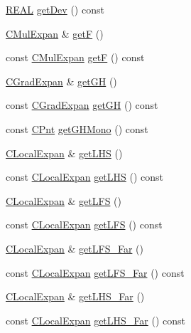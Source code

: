\begin{DoxyCompactItemize}
\item 
\hyperlink{util_8h_a5821460e95a0800cf9f24c38915cbbde}{R\-E\-A\-L} \hyperlink{classCSolExpCenter_a3caaadab06c5e564a1ac18b38f45c5bf}{get\-Dev} () const 
\item 
\hyperlink{classCMulExpan}{C\-Mul\-Expan} \& \hyperlink{classCSolExpCenter_ae5746f40c12b4d7a3b2b7e20f96c505d}{get\-F} ()
\item 
const \hyperlink{classCMulExpan}{C\-Mul\-Expan} \hyperlink{classCSolExpCenter_a525b527c4ed3b15dc53288629abe454b}{get\-F} () const 
\item 
\hyperlink{classCGradExpan}{C\-Grad\-Expan} \& \hyperlink{classCSolExpCenter_a43d12ee9c4f5426b419118e9c4d85c8c}{get\-G\-H} ()
\item 
const \hyperlink{classCGradExpan}{C\-Grad\-Expan} \hyperlink{classCSolExpCenter_abb9805a1517d3af8ccd4cddf5a3d1c61}{get\-G\-H} () const 
\item 
const \hyperlink{classCPnt}{C\-Pnt} \hyperlink{classCSolExpCenter_a070fffcf879ddecf1532a9ded53fdf82}{get\-G\-H\-Mono} () const 
\item 
\hyperlink{classCLocalExpan}{C\-Local\-Expan} \& \hyperlink{classCSolExpCenter_ac6a6b9105b3a11bd1833ab065f02caa2}{get\-L\-H\-S} ()
\item 
const \hyperlink{classCLocalExpan}{C\-Local\-Expan} \hyperlink{classCSolExpCenter_a2431a4b48bfcd38c811de62a361fa40d}{get\-L\-H\-S} () const 
\item 
\hyperlink{classCLocalExpan}{C\-Local\-Expan} \& \hyperlink{classCSolExpCenter_a10c772e491d527515883892857f39d85}{get\-L\-F\-S} ()
\item 
const \hyperlink{classCLocalExpan}{C\-Local\-Expan} \hyperlink{classCSolExpCenter_ad5a4457adddab4b57910380e9d5f156c}{get\-L\-F\-S} () const 
\item 
\hyperlink{classCLocalExpan}{C\-Local\-Expan} \& \hyperlink{classCSolExpCenter_aa609779e1999c0127c22ad4c1b717377}{get\-L\-F\-S\-\_\-\-Far} ()
\item 
const \hyperlink{classCLocalExpan}{C\-Local\-Expan} \hyperlink{classCSolExpCenter_a81f62bb8f4c24422a9e433e96b7324af}{get\-L\-F\-S\-\_\-\-Far} () const 
\item 
\hyperlink{classCLocalExpan}{C\-Local\-Expan} \& \hyperlink{classCSolExpCenter_a494b5f30d5ca7edc5fb24ffe11e6545b}{get\-L\-H\-S\-\_\-\-Far} ()
\item 
const \hyperlink{classCLocalExpan}{C\-Local\-Expan} \hyperlink{classCSolExpCenter_aedfb60fc828a7b9d3cc0b36c5871c661}{get\-L\-H\-S\-\_\-\-Far} () const 
\item 

\end{DoxyCompactItemize}
